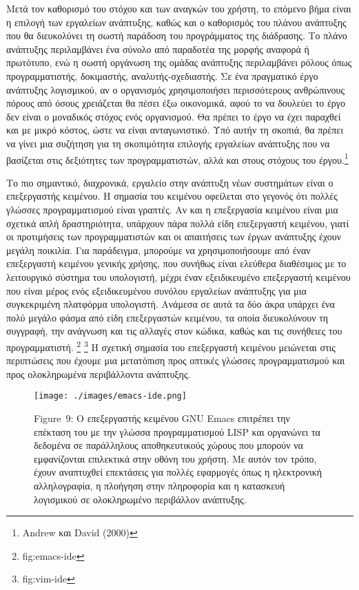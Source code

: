 \documentclass[
]{article}
\begin{document}
Μετά τον καθορισμό του στόχου και των αναγκών του χρήστη, το επόμενο
βήμα είναι η επιλογή των εργαλείων ανάπτυξης, καθώς και ο καθορισμός του
πλάνου ανάπτυξης που θα διευκολύνει τη σωστή παράδοση του προγράμματος
της διάδρασης. Το πλάνο ανάπτυξης περιλαμβάνει ένα σύνολο από παραδοτέα
της μορφής αναφορά ή πρωτότυπο, ενώ η σωστή οργάνωση της ομάδας
ανάπτυξης περιλαμβάνει ρόλους όπως προγραμματιστής, δοκιμαστής,
αναλυτής-σχεδιαστής. Σε ένα πραγματικό έργο ανάπτυξης λογισμικού, αν ο
οργανισμός χρησιμοποιήσει περισσότερους ανθρώπινους πόρους από όσους
χρειάζεται θα πέσει έξω οικονομικά, αφού το να δουλεύει το έργο δεν
είναι ο μοναδικός στόχος ενός οργανισμού. Θα πρέπει το έργο να έχει
παραχθεί και με μικρό κόστος, ώστε να είναι ανταγωνιστικό. Υπό αυτήν τη
σκοπιά, θα πρέπει να γίνει μια συζήτηση για τη σκοπιμότητα επιλογής
εργαλείων ανάπτυξης που να βασίζεται στις δεξιότητες των
προγραμματιστών, αλλά και στους στόχους του έργου.\footnote{Andrew και
  David (2000)}

Το πιο σημαντικό, διαχρονικά, εργαλείο στην ανάπτυξη νέων συστημάτων
είναι ο επεξεργαστής κειμένου. Η σημασία του κειμένου οφείλεται στο
γεγονός ότι πολλές γλώσσες προγραμματισμού είναι γραπτές. Αν και η
επεξεργασία κειμένου είναι μια σχετικά απλή δραστηριότητα, υπάρχουν πάρα
πολλά είδη επεξεργαστή κειμένου, γιατί οι προτιμήσεις των
προγραμματιστών και οι απαιτήσεις των έργων ανάπτυξης έχουν μεγάλη
ποικιλία. Για παράδειγμα, μπορούμε να χρησιμοποιήσουμε από έναν
επεξεργαστή κειμένου γενικής χρήσης, που συνήθως είναι ελεύθερα
διαθέσιμος με το λειτουργικό σύστημα του υπολογιστή, μέχρι έναν
εξειδικευμένο επεξεργαστή κειμένου που είναι μέρος ενός εξειδικευμένου
συνόλου εργαλείων ανάπτυξης για μια συγκεκριμένη πλατφόρμα υπολογιστή.
Ανάμεσα σε αυτά τα δύο άκρα υπάρχει ένα πολύ μεγάλο φάσμα από είδη
επεξεργαστών κειμένου, τα οποία διευκολύνουν τη συγγραφή, την ανάγνωση
και τις αλλαγές στον κώδικα, καθώς και τις συνήθειες του προγραμματιστή.
\footnote{fig:emacs-ide} \footnote{fig:vim-ide} Η σχετική σημασία του
επεξεργαστή κειμένου μειώνεται στις περιπτώσεις που έχουμε μια
μετατόπιση προς οπτικές γλώσσες προγραμματισμού και προς ολοκληρωμένα
περιβάλλοντα ανάπτυξης.

\leavevmode{}%
\begin{figure}
\hypertarget{fig:emacs-ide}{%
\centering
\texttt{[image: ./images/emacs-ide.png]}
\caption{Figure~9: Ο επεξεργαστής κειμένου GNU Emacs επιτρέπει την
επέκταση του με την γλώσσα προγραμματισμού LISP και οργανώνει τα
δεδομένα σε παράλληλους αποθηκευτικούς χώρους που μπορούν να
εμφανίζονται επιλεκτικά στην οθόνη του χρήστη. Με αυτόν τον τρόπο, έχουν
αναπτυχθεί επεκτάσεις για πολλές εφαρμογές όπως η ηλεκτρονική
αλληλογραφία, η πλοήγηση στην πληροφορία και η κατασκευή λογισμικού σε
ολοκληρωμένο περιβάλλον ανάπτυξης.}\label{fig:emacs-ide}
}
\end{figure}
\end{document}
